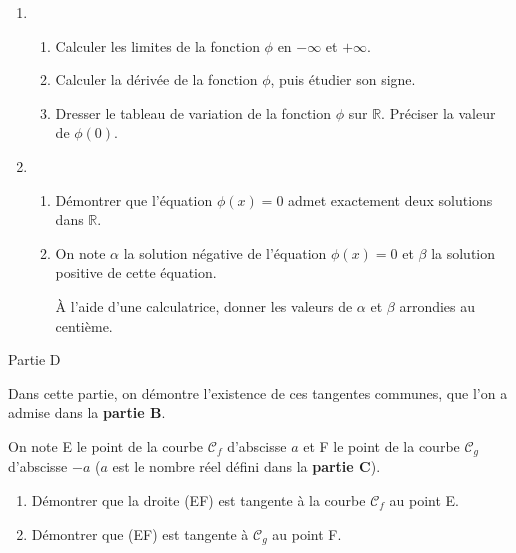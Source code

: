 \begin{enumerate}
     \item
     \begin{enumerate}[label=\alph*.]
          \item
          Calculer les limites de la fonction $\phi $ en $-\infty $ et $+ \infty $.
          \item
          Calculer la dérivée de la fonction $\phi $, puis étudier son signe.
          \item
     Dresser le tableau de variation de la fonction $\phi $ sur $\mathbb{R}$. Préciser la valeur de $\phi \left(0\right)$.\end{enumerate}
     \item
     \begin{enumerate}[label=\alph*.]
          \item
          Démontrer que l'équation $\phi \left(x\right)=0$ admet exactement deux solutions dans $\mathbb{R}$.
          \item
          On note $\alpha $ la solution négative de l'équation $\phi \left(x\right)=0$ et $\beta $ la solution positive de cette équation.
          \par
     À l'aide d'une calculatrice, donner les valeurs de $\alpha $ et $\beta $ arrondies au centième.\end{enumerate}
\end{enumerate}
\begin{h3}Partie D\end{h3}
Dans cette partie, on démontre l'existence de ces tangentes communes, que l'on a admise dans la \textbf{partie B}.
\par
On note E le point de la courbe $\mathscr C_{f}$ d'abscisse $a$ et F le point de la courbe $\mathscr C_{g}$ d'abscisse $-a$ ($a$ est le nombre réel défini dans la \textbf{partie C}).
\begin{enumerate}
     \item
     Démontrer que la droite (EF) est tangente à la courbe $\mathscr C_{f}$ au point E.
     \item
Démontrer que (EF) est tangente à $\mathscr C_{g}$ au point F. \end{enumerate}
